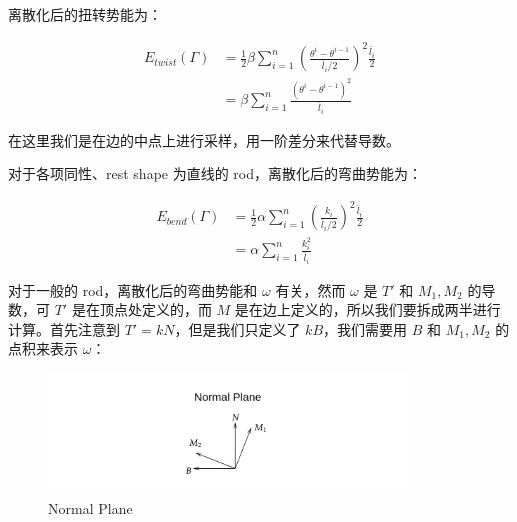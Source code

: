 \documentclass{notes}
\begin{document}
\begin{definition}
	离散化后的扭转势能为：

	\begin{equation}
		\begin{aligned}
			E_{twist}(\Gamma) &= \frac{1}{2} \beta\sum\limits_{i = 1}^{n} \left(\frac{\theta^{i} - \theta^{i - 1}}{\bar{l}_i / 2} \right)^2 \frac{\bar{l}_i}{2}  \\
			&= \beta \sum\limits_{i = 1}^{n} \frac{(\theta^i - \theta^{i - 1})^2}{\bar{l}_i}
		\end{aligned}
	\end{equation}
\end{definition}

\begin{remark}
	在这里我们是在边的中点上进行采样，用一阶差分来代替导数。
\end{remark}

\begin{definition}
	对于各项同性、rest shape 为直线的 rod，离散化后的弯曲势能为：

	\begin{equation}
		\begin{aligned}
			E_{bend}(\Gamma) &= \frac{1}{2} \alpha \sum\limits_{i = 1}^{n} \left(\frac{k_i}{\bar{l}_i / 2} \right)^2 \frac{\bar{l}_i}{2} \\
			&= \alpha \sum\limits_{i = 1}^{n} \frac{k_i^2}{\bar{l}_i} 
		\end{aligned}
	\end{equation}
\end{definition}

对于一般的 rod，离散化后的弯曲势能和 $\omega$ 有关，然而 $\omega$ 是 $T'$ 和 $M_1, M_2$ 的导数，可 $T'$ 是在顶点处定义的，而 $M$ 是在边上定义的，所以我们要拆成两半进行计算。首先注意到 $T' = kN$，但是我们只定义了 $kB$，我们需要用 $B$ 和 $M_1, M_2$ 的点积来表示 $\omega$：

\begin{figure}[H]
	\centering
	\includegraphics[width=0.85\textwidth]{img/normal-plane.png}
	\caption{Normal Plane}
\end{figure}
\end{document}
